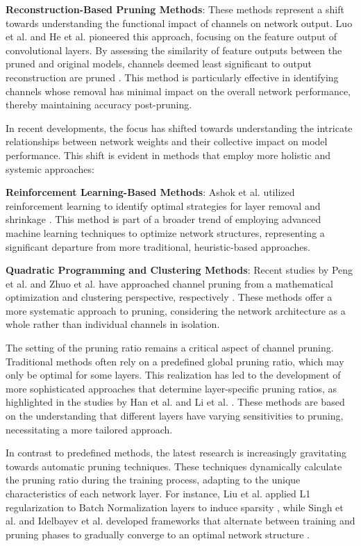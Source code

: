 \documentclass[sigconf, 10pt]{acmart}
\begin{document}
\textbf{Reconstruction-Based Pruning Methods}: These methods represent a shift towards understanding the functional impact of channels on network output. Luo et al. and He et al. pioneered this approach, focusing on the feature output of convolutional layers. By assessing the similarity of feature outputs between the pruned and original models, channels deemed least significant to output reconstruction are pruned \cite{21,22}. This method is particularly effective in identifying channels whose removal has minimal impact on the overall network performance, thereby maintaining accuracy post-pruning.

In recent developments, the focus has shifted towards understanding the intricate relationships between network weights and their collective impact on model performance. This shift is evident in methods that employ more holistic and systemic approaches:


\textbf{Reinforcement Learning-Based Methods}: Ashok et al. utilized reinforcement learning to identify optimal strategies for layer removal and shrinkage \cite{23}. This method is part of a broader trend of employing advanced machine learning techniques to optimize network structures, representing a significant departure from more traditional, heuristic-based approaches.

\textbf{Quadratic Programming and Clustering Methods}: Recent studies by Peng et al. and Zhuo et al. have approached channel pruning from a mathematical optimization and clustering perspective, respectively \cite{24,tzelepis2019deep}. These methods offer a more systematic approach to pruning, considering the network architecture as a whole rather than individual channels in isolation.

The setting of the pruning ratio remains a critical aspect of channel pruning. Traditional methods often rely on a predefined global pruning ratio, which may only be optimal for some layers. This realization has led to the development of more sophisticated approaches that determine layer-specific pruning ratios, as highlighted in the studies by Han et al. and Li et al. \cite{18,2015Learning}. These methods are based on the understanding that different layers have varying sensitivities to pruning, necessitating a more tailored approach.

In contrast to predefined methods, the latest research is increasingly gravitating towards automatic pruning techniques. These techniques dynamically calculate the pruning ratio during the training process, adapting to the unique characteristics of each network layer. For instance, Liu et al. applied L1 regularization to Batch Normalization layers to induce sparsity \cite{29}, while Singh et al. and Idelbayev et al. developed frameworks that alternate between training and pruning phases to gradually converge to an optimal network structure \cite{30,31}.
\end{document}
